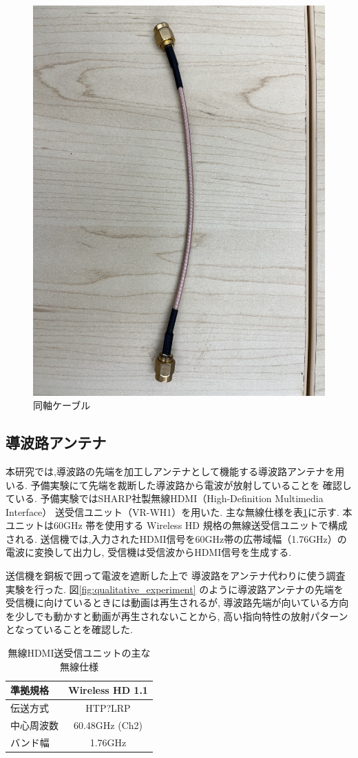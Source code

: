 \documentclass[technicalreport]{ieicej}
\begin{document}
\begin{figure}[tb]
  \begin{center}
    \includegraphics[bb=0.000000 0.000000 593.264305 791.019074, width=0.5\linewidth]{img/sma_cables.pdf}
    \caption{同軸ケーブル}
    \label{fig:sma_cables}
  \end{center}
\end{figure}

\subsection{導波路アンテナ}

本研究では,導波路の先端を加工しアンテナとして機能する導波路アンテナを用いる.
予備実験にて先端を裁断した導波路から電波が放射していることを
確認している.
予備実験ではSHARP社製無線HDMI（High-Definition Multimedia Interface）
送受信ユニット（VR-WH1）を用いた.
主な無線仕様を表\ref{table:wireless}に示す.
本ユニットは60GHz 帯を使用する Wireless HD 規格の無線送受信ユニットで構成される.
送信機では,入力されたHDMI信号を60GHz帯の広帯域幅（1.76GHz）の電波に変換して出力し,
受信機は受信波からHDMI信号を生成する.

送信機を銅板で囲って電波を遮断した上で
導波路をアンテナ代わりに使う調査実験を行った.
図\ref{fig:qualitative_experiment}
のように導波路アンテナの先端を
受信機に向けているときには動画は再生されるが,
導波路先端が向いている方向を少しでも動かすと動画が再生されないことから,
高い指向特性の放射パターンとなっていることを確認した.

\begin{table}[tb]
  \centering
  \label{table:wireless}
  \caption{無線HDMI送受信ユニットの主な無線仕様}
  \begin{tabular}{lc}
    \hline
    準拠規格 & Wireless HD 1.1 \\
    \hline\hline
    伝送方式 & HTP?LRP \\
    \hline
    中心周波数 & 60.48GHz (Ch2) \\
    \hline
    バンド幅 & 1.76GHz \\
    \hline
  \end{tabular}
 \end{table}
\end{document}
